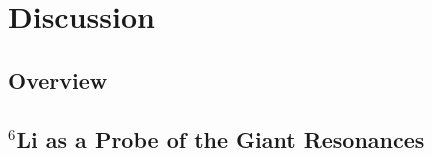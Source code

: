 %
%

\chapter{Discussion}
\label{chp:li-disc}

\section{Overview}
\label{sec:li-disc-overview}

\section{$^6$Li as a Probe of the Giant Resonances}
\label{sec:li-disc-li-as-probe}